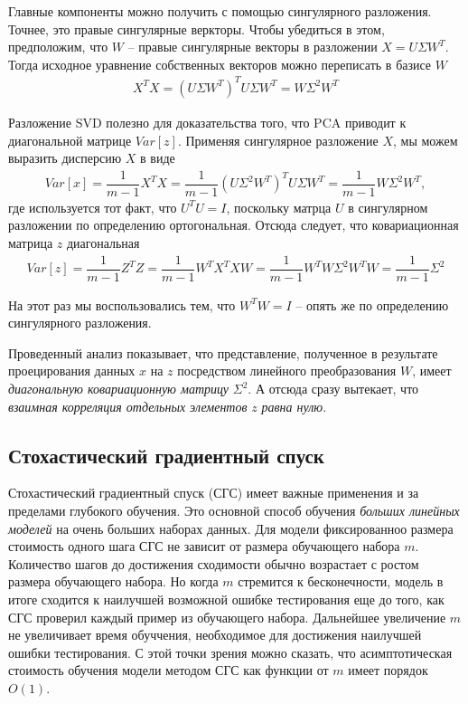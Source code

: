 \documentclass[%
	11pt,
	a4paper,
	utf8,
]{article}
\begin{document}
Главные компоненты можно получить с помощью сингулярного разложения. Точнее, это правые сингулярные веркторы. Чтобы убедиться в этом, предположим, что $ W $ -- правые сингулярные векторы в разложении $ X = U \Sigma W^T $. Тогда исходное уравнение собственных векторов можно переписать в базисе $ W $
\begin{align*}
	X^T X = (U \Sigma W^T)^T U \Sigma W^T = W \Sigma^2 W^T
\end{align*}

Разложение SVD полезно для доказательства того, что PCA приводит к диагональной матрице $ Var[z] $. Применяя сингулярное разложение $ X $, мы можем выразить дисперсию $ X $ в виде
\begin{align*}
	Var[x] = \dfrac{1}{m - 1} X^T X = \dfrac{1}{m - 1} (U \Sigma^2 W^T)^T U \Sigma W^T = \dfrac{1}{m - 1} W \Sigma^2 W^T,
\end{align*}
где используется тот факт, что $ U^T U = I $, поскольку матрца $ U $ в сингулярном разложении по определению ортогональная. Отсюда следует, что ковариационная матрица $ z $ диагональная
\begin{align*}
	Var[z] = \dfrac{1}{m - 1} Z^T Z = \dfrac{1}{m - 1}W^T X^T X W = \dfrac{1}{m-1} W^T W \Sigma^2 W^T W = \dfrac{1}{m - 1}\Sigma^2
\end{align*}

На этот раз мы воспользовались тем, что $ W^T W = I $ -- опять же по определению сингулярного разложения.

Проведенный анализ показывает, что {\color{blue}представление, полученное в результате проецирования данных $ x $ на $ z $ посредством линейного преобразования $ W $, имеет \emph{диагональную ковариационную матрицу} $ \Sigma^2 $. А отсюда сразу вытекает, что \emph{взаимная корреляция отдельных элементов} $ z $ \emph{равна нулю}.}

\subsection{Стохастический градиентный спуск}

Стохастический градиентный спуск (СГС) имеет важные применения и за пределами глубокого обучения. Это основной способ обучения \emph{больших линейных моделей} на очень больших наборах данных. Для модели фиксированноо размера стоимость одного шага СГС не зависит от размера обучающего набора $ m $. Количество шагов до достижения сходимости обычно возрастает с ростом размера обучающего набора. Но когда $ m $ стремится к бесконечности, модель в итоге сходится к наилучшей возможной ошибке тестирования еще до того, как СГС проверил каждый пример из обучающего набора. Дальнейшее увеличение $ m $ не увеличивает время обуччения, необходимое для достижения наилучшей ошибки тестирования. {\color{blue}С этой точки зрения можно сказать, что асимптотическая стоимость обучения модели методом СГС как функции от $ m $ имеет порядок~$ O(1) $.}
\end{document}

